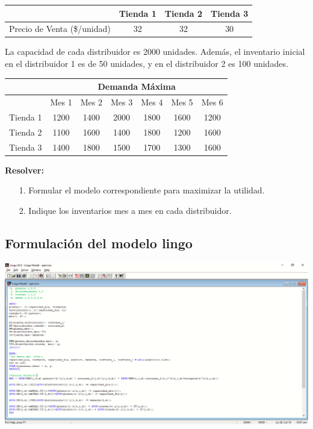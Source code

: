 \documentclass[12pt]{article}
\begin{document}
\begin{center}
\begin{tabular}{|c|c|c|c|}
  \hline
  & Tienda 1 & Tienda 2 & Tienda 3 \\
  \hline
  Precio de Venta (\$/unidad) & 32 & 32 & 30 \\
  \hline
\end{tabular}
\end{center}

\vspace{1cm}

\noindent La capacidad de cada distribuidor es 2000 unidades. Además, el inventario inicial en el
distribuidor 1 es de 50 unidades, y en el distribuidor 2 es 100 unidades.

\begin{center}
\begin{tabular}{|c|c|c|c|c|c|c|}
  \hline
  & \multicolumn{6}{c|}{Demanda Máxima}\\
  \hline
  & Mes 1 & Mes 2 & Mes 3 & Mes 4 & Mes 5 & Mes 6 \\
  \hline
  Tienda 1 & 1200 & 1400 & 2000 & 1800 & 1600 & 1200 \\
  \hline
  Tienda 2 & 1100 & 1600 & 1400 & 1800 & 1200 & 1600 \\
  \hline
  Tienda 3 & 1400 & 1800 & 1500 & 1700 & 1300 & 1600 \\
  \hline
\end{tabular}
\end{center}

\vspace{1cm}

\noindent\textbf{Resolver:}
\begin{itemize}
  \item[1.] Formular el modelo correspondiente para maximizar la utilidad.
  \item[2.] Indique los inventarios mes a mes en cada distribuidor. 
\end{itemize}

\subsection*{Formulación del modelo lingo}
\begin{center}
  \includegraphics[width=\linewidth]{assets/modelo-lingo.PNG}
\end{center}
\end{document}
